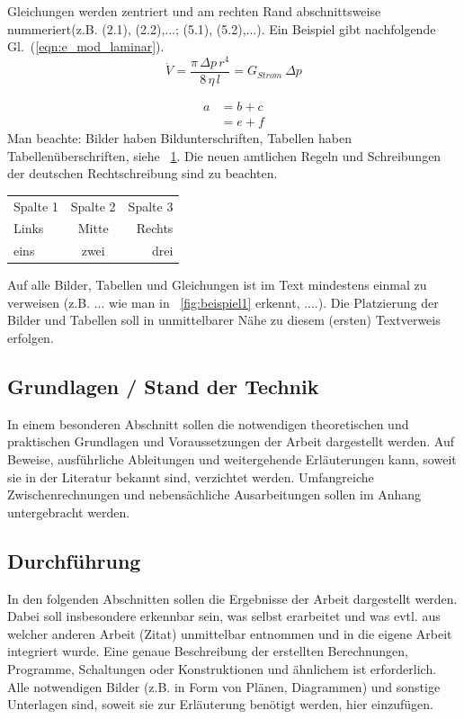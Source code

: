 Gleichungen werden zentriert und am rechten Rand abschnittsweise nummeriert(z.B. (2.1), (2.2),...; (5.1),
(5.2),...). Ein Beispiel gibt nachfolgende Gl.~(\ref{eqn:e_mod_laminar}).
\begin{equation}\label{eqn:e_mod_laminar}
	\dot V = \frac{\pi \, \Delta p \, r^4}{8 \, \eta \, l} =
	G_{Strom} \: \Delta p
\end{equation}

\begin{equation}\label{erster}
	\begin{split}
		a &= b +c \\
		&= e + f
	\end{split}
\end{equation}
Man beachte: Bilder haben Bildunterschriften, Tabellen haben Tabellenüberschriften, siehe
\tablename~\ref{tab:beispiel}. Die neuen amtlichen Regeln und Schreibungen der deutschen
Rechtschreibung sind zu beachten.

\begin{table}[!ht]
	\centering
	\begin{tabular}{l|cr}
		Spalte 1 & Spalte 2 & Spalte 3\\
		\hhline{|=|==|}
		Links & Mitte & Rechts\\
		\hhline{---}
		eins & zwei & drei
	\end{tabular}
	\label{tab:beispiel}
\end{table}

Auf alle Bilder, Tabellen und Gleichungen ist im Text mindestens einmal zu verweisen (z.B. ... wie
man in \figurename~\ref{fig:beispiel1} erkennt, ....). Die Platzierung der Bilder und Tabellen soll in
unmittelbarer Nähe zu diesem (ersten) Textverweis erfolgen.


\subsection{Grundlagen / Stand der Technik}
In einem besonderen Abschnitt sollen die notwendigen theoretischen und praktischen Grundlagen
und Voraussetzungen der Arbeit dargestellt werden. Auf Beweise, ausführliche Ableitungen und
weitergehende Erläuterungen kann, soweit sie in der Literatur bekannt sind, verzichtet werden.
Umfangreiche Zwischenrechnungen und nebensächliche Ausarbeitungen sollen im Anhang
untergebracht werden.

\subsection{Durchführung}
In den folgenden Abschnitten sollen die Ergebnisse der Arbeit dargestellt werden. Dabei soll insbesondere
erkennbar sein, was selbst erarbeitet und was evtl. aus welcher anderen Arbeit (Zitat) unmittelbar
entnommen und in die eigene Arbeit integriert wurde. Eine genaue Beschreibung der
erstellten Berechnungen, Programme, Schaltungen oder Konstruktionen und ähnlichem ist
erforderlich. Alle notwendigen Bilder (z.B. in Form von Plänen, Diagrammen) und sonstige
Unterlagen sind, soweit sie zur Erläuterung benötigt werden, hier einzufügen.


